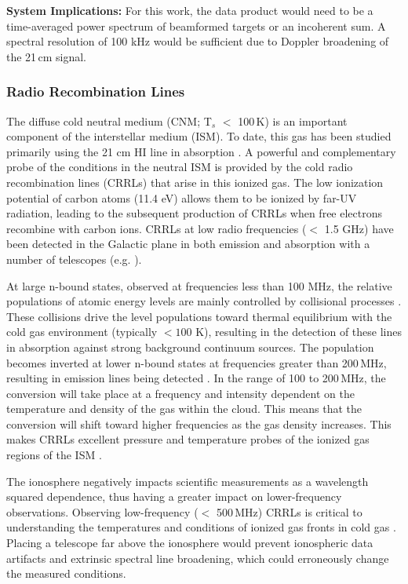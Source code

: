 \textbf{System Implications:} For this work, the data product would need to be a time-averaged power spectrum of beamformed targets or an incoherent sum. A spectral resolution of 100 kHz would be sufficient due to Doppler broadening of the 21\,cm signal. %

\subsubsection{Radio Recombination Lines}
The diffuse cold neutral medium (CNM; T$_{s}$ $<$ 100\,K) is an important component of the interstellar medium (ISM). To date, this gas has been studied primarily using the 21 cm H{\sc I} line in absorption \citep{Dickey_1990}. A powerful and complementary probe of the conditions in the neutral ISM is provided by the cold radio recombination lines (CRRLs) that arise in this ionized gas. The low ionization potential of carbon atoms (11.4 eV) allows them to be ionized by far-UV radiation, leading to the subsequent production of CRRLs when free electrons recombine with carbon ions. CRRLs at low radio frequencies ($<$ 1.5 GHz) have been detected in the Galactic plane in both emission and absorption with a number of telescopes (e.g. \citealt{Kantharia_2001,Salas_2019,GDIGS}). 

At large n-bound states, observed at frequencies less than 100 MHz, the relative populations of atomic energy levels are mainly controlled by collisional processes \citep{Tremblay_2018}. These collisions drive the level populations toward thermal equilibrium with the cold gas environment (typically $< 100$ K), resulting in the detection of these lines in absorption against strong background continuum sources. The population becomes inverted at lower n-bound states at frequencies greater than 200\,MHz, resulting in emission lines being detected \citep{Gordon-RRL}. In the range of 100 to 200\,MHz, the conversion will take place at a frequency and intensity dependent on the temperature and density of the gas within the cloud. This means that the conversion will shift toward higher frequencies as the gas density increases. This makes CRRLs excellent pressure and temperature probes of the ionized gas regions of the ISM \citep{Salas_2019}.

The ionosphere negatively impacts scientific measurements as a wavelength squared dependence, thus having a greater impact on lower-frequency observations. Observing low-frequency ($<$ 500\,MHz) CRRLs is critical to understanding the temperatures and conditions of ionized gas fronts in cold gas \citep{Salas_2018}. Placing a telescope far above the ionosphere would prevent ionospheric data artifacts and extrinsic spectral line broadening, which could erroneously change the measured conditions.

